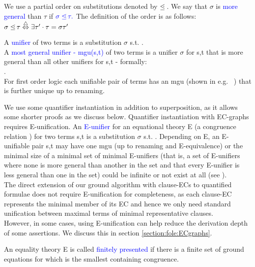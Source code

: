 \noindent
We use a partial order on substitutions denoted by $\leqdot$. We say that $\sigma$ is \textcolor{blue}{more general} than $\tau$ if $\textcolor{blue}{\sigma \leqdot \tau.}$ The definition of the order is as follows:\\
$\sigma \leqdot \tau \equivdef \exists \tau' \cdot \tau = \sigma\tau'$

\noindent
A \textcolor{blue}{unifier} of two terms  is a substitution $\sigma$ s.t. .\\
A \textcolor{blue}{most general unifier - mgu(s,t)} of two terms  is a unifier $\sigma$ for s,t that is more general than all other unifiers for s,t - formally:\\
.\\
For first order logic each unifiable pair of terms has an mgu (shown in e.g. ~\cite{Baader2001445}) that is further unique up to renaming. 

\noindent
We use some quantifier instantiation in addition to superposition, as it allows some shorter proofs as we discuss below. Quantifier instantiation with EC-graphs requires E-unification.
An \textcolor{blue}{E-unifier} for an equational theory E (a congruence relation ) for two terms s,t is a substitution $\sigma$ s.t. . Depending on E, an E-unifiable pair s,t may have one mgu (up to renaming and E-equivalence) or the minimal size of a minimal set of minimal E-unifiers 
(that is, a set of E-unifiers where none is more general than another in the set and that every E-unifier is less general than one in the set) could be infinite or not exist at all (see  \cite{Baader2001445}).\\
The direct extension of our ground algorithm with clause-ECs to quantified formulae does not require E-unification for completeness, 
as each clause-EC represents the minimal member of its EC and hence we only need standard unification between maximal terms of minimal representative clauses.\\
However, in some cases, using E-unification can help reduce the derivation depth of some assertions. We discuss this in section \ref{section:fole:ECgraphs}.

\noindent
An equality theory E is called \textcolor{blue}{finitely presented} if there is a finite set of ground equations for which  is the smallest containing congruence.


